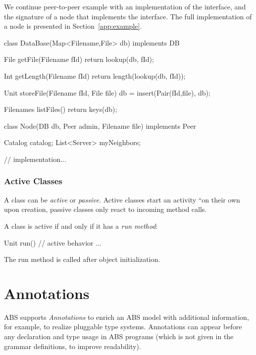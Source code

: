 %
%

We continue peer-to-peer example with an implementation of the 
interface, and the signature of a node that implements the 
interface. The full implementation of a node is presented in Section~\ref{app:example}.
%

\begin{absexample}
class DataBase(Map<Filename,File> db) implements DB {
  File getFile(Filename fId) {
      return lookup(db, fId);
  }
  
  Int getLength(Filename fId){
      return length(lookup(db, fId));
  }
  
  Unit storeFile(Filename fId, File file) {
      db = insert(Pair(fId,file), db);
  }
  
  Filenames listFiles() {
      return keys(db);
  }
}

class Node(DB db, Peer admin, Filename file) implements Peer {
  Catalog catalog;
  List<Server> myNeighbors;

  // implementation...
}
\end{absexample}

\subsubsection{Active Classes}
\label{sec:active-classes}

A class can be \emph{active} or \emph{passive}.  Active classes start an
activity ``on their own upon creation, passive classes only react to
incoming method calls.

A class is active if and only if it has a \emph{run method}:
\begin{absexample}
Unit run() {
  // active behavior ...
}
\end{absexample}
The run method is called after object initialization.  

\section{Annotations}
ABS supports \emph{Annotations} to enrich an ABS model with additional information, for example, to realize pluggable type systems.
Annotations can appear before any declaration and type usage in ABS programs (which is not given in the grammar definitions, to improve readability).

